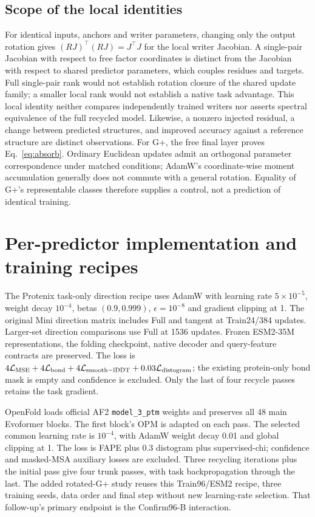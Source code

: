 

\subsection{Scope of the local identities}
For identical inputs, anchors and writer parameters, changing only the
output rotation gives $(RJ)^\top(RJ)=J^\top J$ for the local writer Jacobian.
A single-pair Jacobian with respect to free factor coordinates is distinct
from the Jacobian with respect to shared predictor parameters, which couples
residues and targets. Full single-pair rank would not establish rotation
closure of the shared update family; a smaller local rank would not establish
a native task advantage. This local identity neither compares independently
trained writers nor asserts spectral equivalence of the full recycled model.
Likewise, a nonzero injected residual, a change between predicted structures,
and improved accuracy against a reference structure are distinct observations.
For G+, the free final layer proves Eq.~\ref{eq:absorb}. Ordinary Euclidean
updates admit an orthogonal parameter correspondence under matched conditions;
AdamW's coordinate-wise moment accumulation generally does not commute with a
general rotation. Equality of G+'s representable classes therefore supplies a
control, not a prediction of identical training.

\section{Per-predictor implementation and training recipes}
\label{app:recipes}


The Protenix task-only direction recipe uses AdamW with learning rate
$5\times10^{-5}$, weight decay $10^{-4}$, betas $(0.9,0.999)$,
$\epsilon=10^{-8}$ and gradient clipping at 1. The original Mini direction
matrix includes Full and tangent at Train24/384 updates. Larger-set direction
comparisons use Full at 1536 updates. Frozen ESM2-35M representations, the
folding checkpoint, native decoder and query-feature contracts are preserved.
The loss is $4\mathcal L_{\rm MSE}+4\mathcal L_{\rm bond}+
4\mathcal L_{\rm smooth-lDDT}+0.03\mathcal L_{\rm distogram}$;
the existing protein-only bond mask is empty and confidence is excluded.
Only the last of four recycle passes retains the task gradient.

OpenFold loads official AF2 \texttt{model\_3\_ptm} weights and preserves all
48 main Evoformer blocks. The first block's OPM is adapted on each pass.
The selected common learning rate is $10^{-4}$, with AdamW weight decay
0.01 and global clipping at 1. The loss is FAPE plus 0.3 distogram plus
supervised-chi; confidence and masked-MSA auxiliary losses are excluded.
Three recycling iterations plus the initial pass give four trunk passes,
with task backpropagation through the last. The added rotated-G+ study reuses
this Train96/ESM2 recipe, three training seeds, data order and final step without new
learning-rate selection. That follow-up's primary endpoint is the Confirm96-B interaction.

